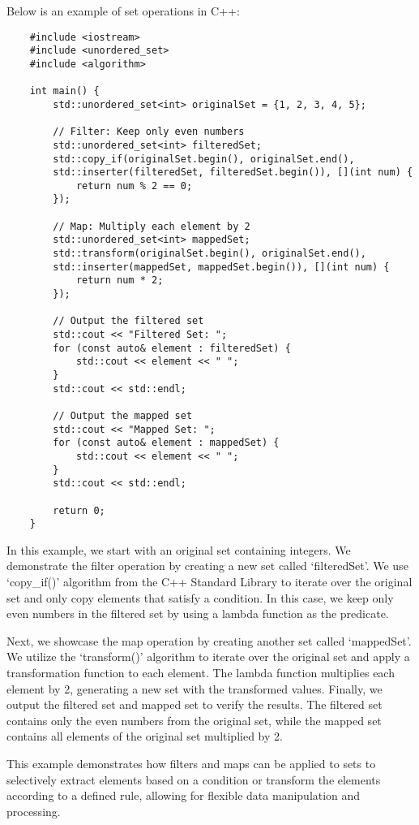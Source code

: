 \begin{solution}
    Below is an example of set operations in C++:

    \horizontalline

    \begin{verbatim}
    #include <iostream>
    #include <unordered_set>
    #include <algorithm>
    
    int main() {
        std::unordered_set<int> originalSet = {1, 2, 3, 4, 5};
    
        // Filter: Keep only even numbers
        std::unordered_set<int> filteredSet;
        std::copy_if(originalSet.begin(), originalSet.end(), 
        std::inserter(filteredSet, filteredSet.begin()), [](int num) {
            return num % 2 == 0;
        });
    
        // Map: Multiply each element by 2
        std::unordered_set<int> mappedSet;
        std::transform(originalSet.begin(), originalSet.end(), 
        std::inserter(mappedSet, mappedSet.begin()), [](int num) {
            return num * 2;
        });
    
        // Output the filtered set
        std::cout << "Filtered Set: ";
        for (const auto& element : filteredSet) {
            std::cout << element << " ";
        }
        std::cout << std::endl;
    
        // Output the mapped set
        std::cout << "Mapped Set: ";
        for (const auto& element : mappedSet) {
            std::cout << element << " ";
        }
        std::cout << std::endl;
    
        return 0;
    }
    \end{verbatim}

    \horizontalline

    In this example, we start with an original set containing integers. We demonstrate the filter operation by creating a new set called `filteredSet'. We use `copy\_if()' algorithm from the C++ Standard Library to iterate over the original set and only copy elements that satisfy a condition. In this case, we keep only even numbers in the filtered set by using a 
    lambda function as the predicate.
    
    Next, we showcase the map operation by creating another set called `mappedSet'. We utilize the `transform()' algorithm to iterate over the original set and apply a transformation function to each element. The lambda function multiplies each element by 2, generating a new set with the transformed values. Finally, we output the filtered set and mapped set to verify 
    the results. The filtered set contains only the even numbers from the original set, while the mapped set contains all elements of the original set multiplied by 2.
    
    This example demonstrates how filters and maps can be applied to sets to selectively extract elements based on a condition or transform the elements according to a defined rule, allowing for flexible data manipulation and processing.
\end{solution}

